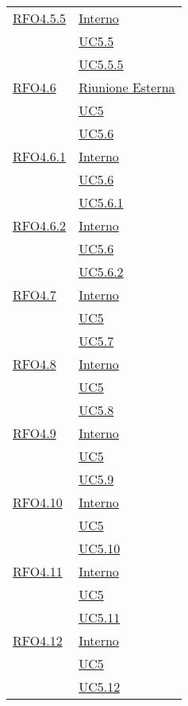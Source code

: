 \begin{longtable}{|>{\centering}m{5cm}|m{5cm}<{\centering}|}
\hyperlink{RFO4.5.5}{RFO4.5.5} &\hyperlink{Interno}{Interno}\\ &\hyperref[UC5.5]{UC5.5}\\ &\hyperref[UC5.5.5]{UC5.5.5}\\ \hline

\hyperlink{RFO4.6}{RFO4.6} & \hyperlink{Riunione Esterna}{Riunione Esterna}\\ &\hyperref[UC5]{UC5}\\ &\hyperref[UC5.6]{UC5.6}\\ \hline

\hyperlink{RFO4.6.1}{RFO4.6.1} &  \hyperlink{Interno}{Interno}\\ &\hyperref[UC5.6]{UC5.6}\\ &\hyperref[UC5.6.1]{UC5.6.1}\\ \hline

\hyperlink{RFO4.6.2}{RFO4.6.2} &  \hyperlink{Interno}{Interno}\\ &\hyperref[UC5.6]{UC5.6}\\ &\hyperref[UC5.6.2]{UC5.6.2}\\ \hline

\hyperlink{RFO4.7}{RFO4.7} &\hyperlink{Interno}{Interno}\\ &\hyperref[UC5]{UC5}\\ &\hyperref[UC5.7]{UC5.7}\\ \hline

\hyperlink{RFO4.8}{RFO4.8} &  \hyperlink{Interno}{Interno}\\ &\hyperref[UC5]{UC5}\\ &\hyperref[UC5.8]{UC5.8}\\ \hline

\hyperlink{RFO4.9}{RFO4.9} &  \hyperlink{Interno}{Interno}\\ &\hyperref[UC5]{UC5}\\ &\hyperref[UC5.9]{UC5.9}\\ \hline

\hyperlink{RFO4.10}{RFO4.10} & \hyperlink{Interno}{Interno}\\ &\hyperref[UC5]{UC5}\\  &\hyperref[UC5.10]{UC5.10}\\ \hline

\hyperlink{RFO4.11}{RFO4.11} &  \hyperlink{Interno}{Interno}\\ &\hyperref[UC5]{UC5}\\ &\hyperref[UC5.11]{UC5.11}\\ \hline

\hyperlink{RFO4.12}{RFO4.12} &  \hyperlink{Interno}{Interno}\\ &\hyperref[UC5]{UC5}\\ &\hyperref[UC5.12]{UC5.12}\\ \hline


\end{longtable}
